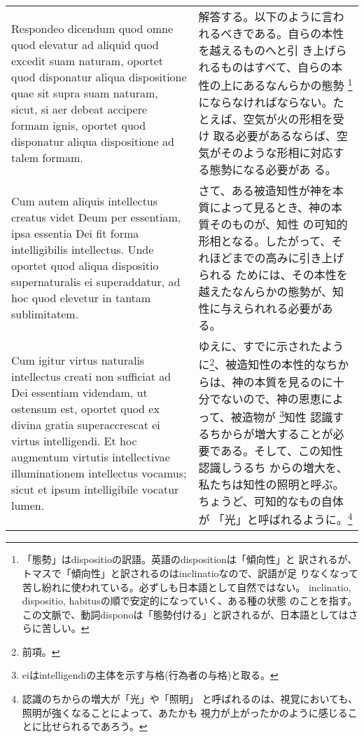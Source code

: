 \documentclass[10pt]{jsarticle} %
\begin{document}
\begin{longtable}{p{21em}p{21em}}
\\

{\sc Respondeo dicendum} quod omne quod elevatur ad aliquid quod
excedit suam naturam, oportet quod disponatur aliqua dispositione quae
sit supra suam naturam, sicut, si aer debeat accipere formam ignis,
oportet quod disponatur aliqua dispositione ad talem formam. 

&

解答する。以下のように言われるべきである。自らの本性を越えるものへと引
き上げられるものはすべて、自らの本性の上にあるなんらかの態勢
\footnote{「態勢」はdispositioの訳語。英語のdispositionは「傾向性」と
訳されるが、トマスで「傾向性」と訳されるのはinclinatioなので、訳語が足
りなくなって苦し紛れに使われている。必ずしも日本語として自然ではない。
inclinatio, dispositio, habitusの順で安定的になっていく、ある種の状態
のことを指す。この文脈で、動詞disponoは「態勢付ける」と訳されるが、日本語としてはさらに苦しい。}にならなければならない。たとえば、空気が火の形相を受け
取る必要があるならば、空気がそのような形相に対応する態勢になる必要があ
る。

\\

Cum autem aliquis intellectus creatus videt Deum per essentiam, ipsa
essentia Dei fit forma intelligibilis intellectus. Unde oportet quod
aliqua dispositio supernaturalis ei superaddatur, ad hoc quod elevetur
in tantam sublimitatem.

&

さて、ある被造知性が神を本質によって見るとき、神の本質そのものが、知性
の可知的形相となる。したがって、それほどまでの高みに引き上げられる
ためには、その本性を越えたなんらかの態勢が、知性に与えられれる必要があ
る。

\\

Cum igitur virtus naturalis intellectus creati
non sufficiat ad Dei essentiam videndam, ut ostensum est, oportet quod
ex divina gratia superaccrescat ei virtus intelligendi. Et hoc
augmentum virtutis intellectivae illuminationem intellectus vocamus;
sicut et ipsum intelligibile vocatur lumen.  

&

ゆえに、すでに示されたように\footnote{前項。}、被造知性の本性的なちか
らは、神の本質を見るのに十分でないので、神の恩恵によって、被造物が
\footnote{eiはintelligendiの主体を示す与格(行為者の与格)と取る。}知性
認識するちからが増大することが必要である。そして、この知性認識しうるち
からの増大を、私たちは知性の照明と呼ぶ。ちょうど、可知的なもの自体が
「光」と呼ばれるように。\footnote{認識のちからの増大が「光」や「照明」
 と呼ばれるのは、視覚においても、照明が強くなることによって、あたかも
 視力が上がったかのように感じることに比せられるであろう。}


\end{longtable}
\end{document}
